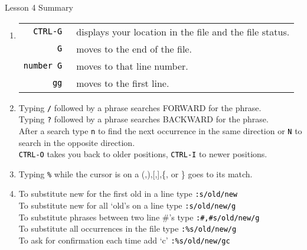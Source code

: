 \documentclass[handout, 10pt]{beamer}
\newcommand{\code}[2][black]{\textcolor{#1}{\colorbox{codegray}{\texttt{#2}}}}
\begin{document}
\begin{frame}{Lesson 4 Summary}
	\begin{enumerate}
		\item
		\begin{tabular}[t]{rl}
			\code{CTRL-G} & ~displays your location in the file and the file
			status. \\
			\code{G} & ~moves to the end of the file. \\
			\code{number G} & ~moves to that line number.\\
			\code{gg} & ~moves to the first line.
		\end{tabular}

		\item Typing \code{/} followed by a phrase searches FORWARD for the
			phrase.	\\
			Typing \code{?} followed by a phrase searches BACKWARD for the
			phrase. \\
			After a search type \code{n} to find the next occurrence in the
			same direction or \code{N} to search in the opposite direction. \\
			\code{CTRL-O} takes you back to older positions, \code{CTRL-I} to
			newer positions.

		\item Typing  \code{\%}  while the cursor is on a (,),[,],\{, or \}
			goes to its match.

		\item To substitute new for the first old in a line type
			\code{:s/old/new} \\
			To substitute new for all `old's on a line type \code{:s/old/new/g}
			\\
			To substitute phrases between two line \#'s type
			\code{:\#,\#s/old/new/g} \\
			To substitute all occurrences in the file type
			\code{:\%s/old/new/g} \\
			To ask for confirmation each time add `c' \code{:\%s/old/new/gc}
	\end{enumerate}
\end{frame}
\end{document}

